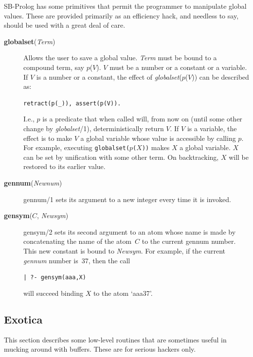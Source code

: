 SB-Prolog has some primitives that permit the programmer to manipulate global
values.
These are provided primarily as an efficiency hack, and needless to say,
should be used with a great deal of care.

\begin{description}
\item[{\bf globalset}({\em Term})]
    Allows the user to save a global value.
    {\em Term} must be bound to a compound term, say $p$($V$).
    $V$ must be a number or a constant or a variable.
    If $V$ is a number or a constant,
    the effect of {\em globalset}($p$($V$)) can be described as:
    \begin{center}
    {\tt retract(p(\_)), assert(p(V)).}
    \end{center}
    I.e., $p$ is a predicate that when called will,
    from now on (until some other change by {\em globalset}/1),
    deterministically return $V$.
    If $V$ is a variable,
    the effect is to make $V$ a global variable whose value is
    accessible by calling $p$.
    For example, executing {\tt globalset($p$($X$))} makes $X$
    a global variable.
    $X$ can be set by unification with some other term.
    On backtracking, $X$ will be restored to its earlier value.

\item[{\bf gennum}({\em Newnum})] 
    gennum/1 sets its argument to a new integer every time it is invoked.

\item[{\bf gensym}($C$, {\em Newsym})] 
    gensym/2 sets its second argument to an atom whose name is made by
    concatenating the name of the atom~$C$ to the current gennum number.
    This new constant is bound to {\em Newsym}.
    For example, if the current {\em gennum} number is~37, then the call
    \begin{center}
    {\tt | ?- gensym(aaa,X)}
    \end{center}
    will succeed binding $X$ to the atom `aaa37'.
\end{description}

\subsection{Exotica}
This section describes some low-level routines that are sometimes useful in
mucking around with buffers.
These are for serious hackers only.

